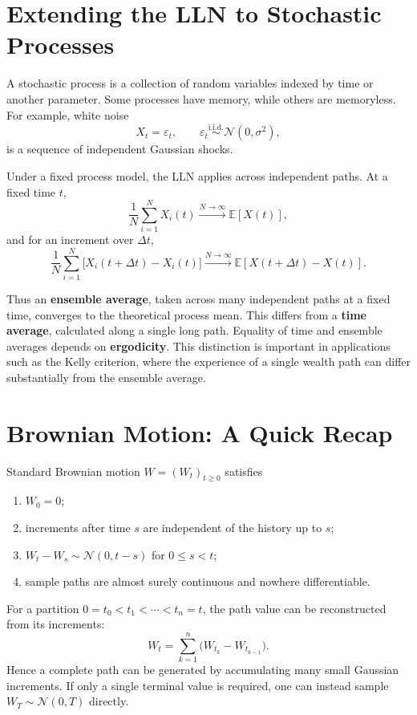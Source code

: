 \documentclass[12pt,openany]{book}
\theoremstyle{definition}
\theoremstyle{remark}
\newcommand{\E}{\mathbb{E}}
\begin{document}
\section{Extending the LLN to Stochastic Processes}

A stochastic process is a collection of random variables indexed by time or
another parameter. Some processes have memory, while others are memoryless.
For example, white noise
\[
X_t=\varepsilon_t,
\qquad
\varepsilon_t\overset{\mathrm{i.i.d.}}{\sim}
\mathcal{N}(0,\sigma^2),
\]
is a sequence of independent Gaussian shocks.

Under a fixed process model, the LLN applies across independent paths. At a
fixed time \(t\),
\[
\frac1N\sum_{i=1}^{N}X_i(t)
\xrightarrow{N\to\infty}\E[X(t)],
\]
and for an increment over \(\Delta t\),
\[
\frac1N\sum_{i=1}^{N}
\bigl[X_i(t+\Delta t)-X_i(t)\bigr]
\xrightarrow{N\to\infty}
\E[X(t+\Delta t)-X(t)].
\]

Thus an \textbf{ensemble average}, taken across many independent paths at a
fixed time, converges to the theoretical process mean. This differs from a
\textbf{time average}, calculated along a single long path. Equality of time
and ensemble averages depends on \textbf{ergodicity}. This distinction is
important in applications such as the Kelly criterion, where the experience
of a single wealth path can differ substantially from the ensemble average.

\section{Brownian Motion: A Quick Recap}

Standard Brownian motion \(W=(W_t)_{t\geq0}\) satisfies
\begin{enumerate}
    \item \(W_0=0\);
    \item increments after time \(s\) are independent of the history up to
    \(s\);
    \item \(W_t-W_s\sim\mathcal{N}(0,t-s)\) for \(0\leq s<t\);
    \item sample paths are almost surely continuous and nowhere
    differentiable.
\end{enumerate}

For a partition \(0=t_0<t_1<\cdots<t_n=t\), the path value can be
reconstructed from its increments:
\[
W_t
=\sum_{k=1}^{n}\bigl(W_{t_k}-W_{t_{k-1}}\bigr).
\]
Hence a complete path can be generated by accumulating many small Gaussian
increments. If only a single terminal value is required, one can instead
sample \(W_T\sim\mathcal{N}(0,T)\) directly.
\end{document}
